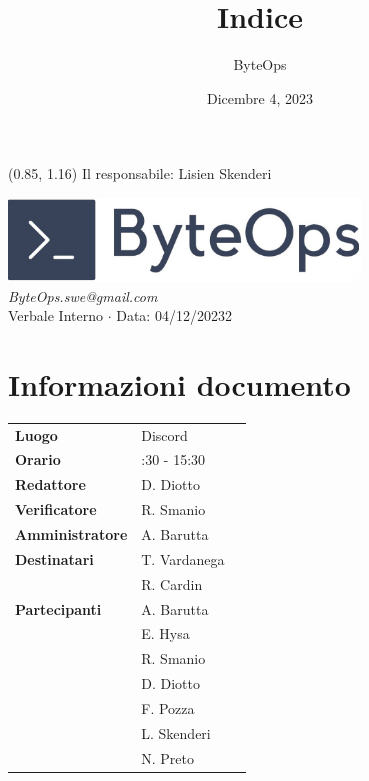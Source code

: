 \documentclass{article}
\title{\textbf{\fontsize{28}{6}\selectfont Indice}}
\author{\fontsize{14}{6}\selectfont ByteOps}
\date{Dicembre 4, 2023}
\begin{document}
\begin{textblock*}{\textwidth}(0.85\textwidth, 1.16\textheight)
    Il responsabile: Lisien Skenderi
\end{textblock*}

\pagestyle{fancy}
\begin{center}
\includegraphics[width = 0.7\textwidth]{../../../Images/logo.png} \\
\vspace{0.2cm}
\textcolor[RGB]{60, 60, 60}{\textit{ByteOps.swe@gmail.com}} \\
\vspace{1cm}
\fontsize{16}{6}\selectfont Verbale Interno $\cdot$ Data: 04/12/20232 \\
\vspace{0.5cm}
\end{center}

\section*{Informazioni documento}
\def\arraystretch{1.2}
\begin{tabular}{>{\raggedleft\arraybackslash}p{}|>{\raggedright\arraybackslash}p{}c}
\hline
\addlinespace
\textbf{Luogo} & Discord \vspace{10pt} \\
\textbf{Orario} & 14:30 - 15:30 \vspace{10pt} \\
\textbf{Redattore} & D. Diotto \vspace{10pt} \\
\textbf{Verificatore} & R. Smanio \vspace{10pt} \\
\textbf{Amministratore} & A. Barutta \vspace{10pt} \\
\textbf{Destinatari} & T. Vardanega \\ & R. Cardin \vspace{10pt} \\
\textbf{Partecipanti} & A. Barutta \\ & E. Hysa \\ & R. Smanio \\ & D. Diotto \\ & F. Pozza \\ & L. Skenderi \\ & N. Preto \vspace{10pt} \\
\end{tabular}
\pagebreak 
\end{document}
